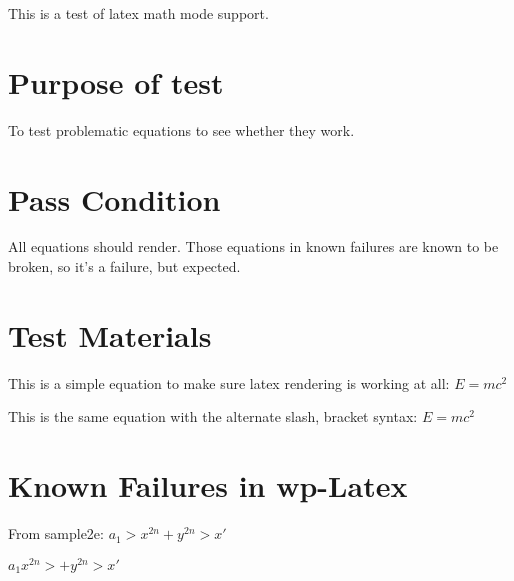\documentclass{article}
\begin{document}
This is a test of latex math mode support. 

\section{Purpose of test}

To test problematic equations to see whether they work. 

\section{Pass Condition}

All equations should render. Those equations in known failures are known to be
broken, so it's a failure, but expected. 

\section{Test Materials}



This is a simple equation to make sure latex rendering is working at all:
$E=mc^{2}$

This is the same equation with the alternate slash, bracket syntax:
\(E=mc^{2}\)



\section{Known Failures in wp-Latex}


From sample2e:  \( a_{1} > x^{2n} + y^{2n} > x' \)

  \( a_{1} x^{2n} > + y ^{2n} > x' \)
\end{document}
